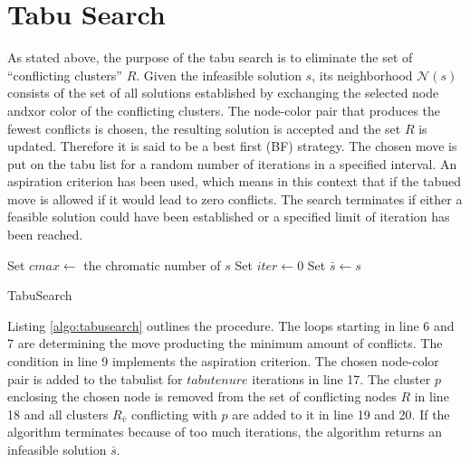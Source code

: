 \section{Tabu Search}
\label{sec:tabu}
As stated above, the purpose of the tabu search is to eliminate the set of ``conflicting clusters'' $R$. Given the infeasible solution $s$, its neighborhood $\mathcal{N}(s)$ consists of the set of all solutions established by exchanging the selected node andxor color of the conflicting clusters. The node-color pair that produces the fewest conflicts is chosen, the resulting solution is accepted and the set $R$ is updated. Therefore it is said to be a best first (BF) strategy. The chosen move is put on the tabu list for a random number of iterations in a specified interval. An aspiration criterion has been used, which means in this context that if the tabued move is allowed if it would lead to zero conflicts. The search terminates if either a feasible solution could have been established or a specified limit of iteration has been reached.

\begin{algorithm}[h]
Set $cmax \gets$ the chromatic number of $s$\;
Set $iter \gets 0$\;
Set $\bar{s} \gets s$\;
\;
\caption{TabuSearch}
\label{algo:tabusearch}
\end{algorithm}

Listing \ref{algo:tabusearch} outlines the procedure. The loops starting in line 6 and 7 are determining the move producting the minimum amount of conflicts. The condition in line 9 implements the aspiration criterion. The chosen node-color pair is added to the tabulist for $\mathit{tabutenure}$ iterations in line 17. The cluster $p$ enclosing the chosen node is removed from the set of conflicting nodes $R$ in line 18 and all clusters $R_{\bar{v}}$ conflicting with $p$ are added to it in line 19 and 20. If the algorithm terminates because of too much iterations, the algorithm returns an infeasible solution $\bar{s}$.


